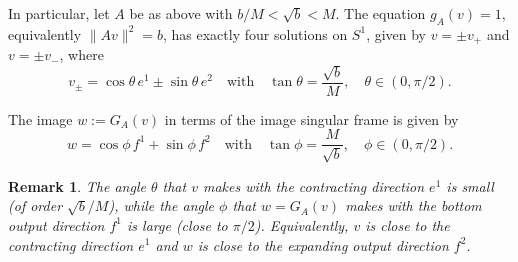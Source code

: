 \documentclass[a4paper,11pt]{article}
\newtheorem{remark}[lemma]{Remark}
\theoremstyle{definition}
\begin{document}
In particular, let $A$ be as above with $b/M < \sqrt{b} < M$. The equation $g_A(v) = 1$, equivalently $\|Av\|^2 = b$, has exactly four solutions on $S^1$, given by $v = \pm v_+$ and $v = \pm v_-$, where
\[
v_\pm = \cos\theta\, e^1 \pm \sin\theta\, e^2 \quad \text{with} \quad \tan\theta = \frac{\sqrt{b}}{M}, \quad \theta \in (0, \pi/2).
\]


The image $w := G_A(v)$ in terms of the image singular frame is given by
\[
w = \cos\phi\, f^1 + \sin\phi\, f^2 \quad \text{with} \quad \tan\phi = \frac{M}{\sqrt{b}}, \quad \phi \in (0, \pi/2).
\]


\begin{remark}
The angle $\theta$ that $v$ makes with the contracting direction $e^1$ is small (of order $\sqrt{b}/M$), while the angle $\phi$ that $w = G_A(v)$ makes with the bottom output direction $f^1$ is large (close to $\pi/2$). Equivalently, $v$ is close to the contracting direction $e^1$ and $w$ is close to the expanding output direction $f^2$.
\end{remark}
\end{document}
